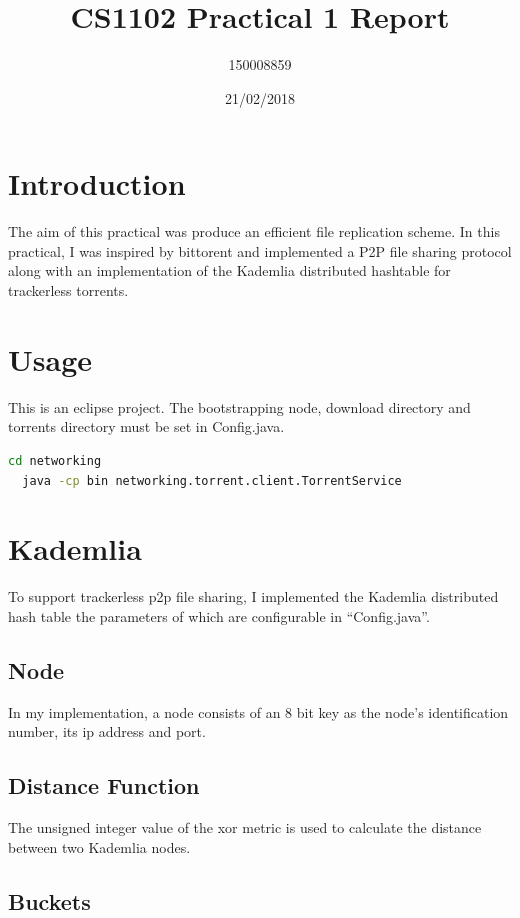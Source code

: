 \documentclass{article}
\title{CS1102 Practical 1 Report}
\date{21/02/2018}
\author{150008859}
\begin{document}
\maketitle
\newpage

\section{Introduction}

The aim of this practical was produce an efficient file replication scheme. In this practical, I was inspired by bittorent and implemented a P2P file sharing protocol along with an implementation of the Kademlia distributed hashtable for trackerless torrents.

\section{Usage}

This is an eclipse project. The bootstrapping node, download directory and torrents directory must be set in Config.java.

\begin{lstlisting}[language=bash]
  cd networking
  java -cp bin networking.torrent.client.TorrentService
\end{lstlisting}


\section{Kademlia}

To support trackerless p2p file sharing, I implemented the Kademlia distributed hash table the parameters of which are configurable in ``Config.java''.

\subsection{Node}

In my implementation, a node consists of an 8 bit key as the node's identification number, its ip address and port. 

\subsection{Distance Function}

The unsigned integer value of the xor metric is used to calculate the distance between two Kademlia nodes.

\subsection{Buckets}
\end{document}
